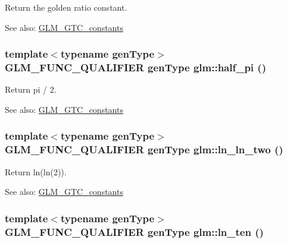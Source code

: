 Return the golden ratio constant. \begin{Desc}
\item[See also:]\hyperlink{group__gtc__constants}{GLM\_\-GTC\_\-constants} \end{Desc}
\hypertarget{group__gtc__constants_gac1d3ec09335dd506ecc76a0097db220}{
\subsubsection[half\_\-pi]{\setlength{\rightskip}{0pt plus 5cm}template$<$typename genType$>$ GLM\_\-FUNC\_\-QUALIFIER genType glm::half\_\-pi ()}}
\label{group__gtc__constants_gac1d3ec09335dd506ecc76a0097db220}


Return pi / 2. \begin{Desc}
\item[See also:]\hyperlink{group__gtc__constants}{GLM\_\-GTC\_\-constants} \end{Desc}
\hypertarget{group__gtc__constants_g938ac709f33297c1324ca30866f3d9a5}{
\subsubsection[ln\_\-ln\_\-two]{\setlength{\rightskip}{0pt plus 5cm}template$<$typename genType$>$ GLM\_\-FUNC\_\-QUALIFIER genType glm::ln\_\-ln\_\-two ()}}
\label{group__gtc__constants_g938ac709f33297c1324ca30866f3d9a5}


Return ln(ln(2)). \begin{Desc}
\item[See also:]\hyperlink{group__gtc__constants}{GLM\_\-GTC\_\-constants} \end{Desc}
\hypertarget{group__gtc__constants_g8b4f9e44073d823e00294592d295d0f1}{
\subsubsection[ln\_\-ten]{\setlength{\rightskip}{0pt plus 5cm}template$<$typename genType$>$ GLM\_\-FUNC\_\-QUALIFIER genType glm::ln\_\-ten ()}}
\label{group__gtc__constants_g8b4f9e44073d823e00294592d295d0f1}


